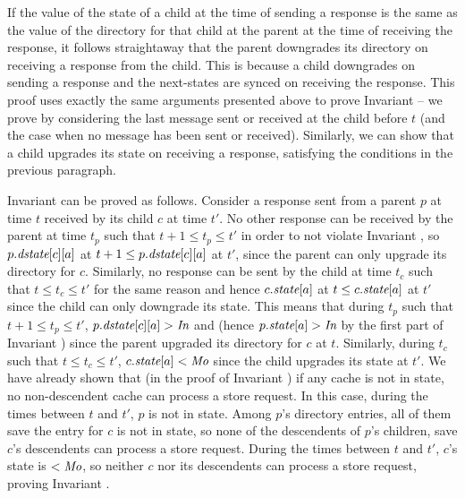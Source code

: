 If the value of the state of a child at the time of sending a response is the
same as the value of the directory for that child at the parent at the time of
receiving the response, it follows straightaway that the parent downgrades its
directory on receiving a response from the child. This is because a child
downgrades on sending a response and the next-states are synced on receiving
the response.  This proof uses exactly the same arguments presented above to
prove Invariant  -- we prove by considering the last
message sent or received at the child before $t$ (and the case when no message
has been sent or received). Similarly, we can show that a child upgrades its
state on receiving a response, satisfying the conditions in the previous paragraph.

Invariant  can be proved as follows. Consider a
response sent from a parent $p$ at time $t$ received by its child $c$ at time
$t'$. No other response can be received by the parent at time $t_p$ such that
$t+1 \le t_p \le t'$ in order to not violate Invariant , so
$p.\textit{dstate}[c][a]$ at $t+1 \le p.\textit{dstate}[c][a]$ at $t'$, since the parent can
only upgrade its directory for $c$. Similarly, no response can be sent by the
child at time $t_c$ such that $t \le t_c \le t'$ for the same reason and hence
$c.\textit{state}[a]$ at $t \le c.\textit{state}[a]$ at $t'$ since the child can only downgrade
its state.  This means that during $t_p$ such that $t+1 \le t_p \le t'$,
$p.\textit{dstate}[c][a] > \textit{In}$ and (hence $p.\textit{state}[a] > \textit{In}$ by the first part of
Invariant ) since the parent upgraded its directory
for $c$ at $t$.  Similarly, during $t_c$ such that $t \le t_c \le t'$,
$c.\textit{state}[a] < \textit{Mo}$ since the child upgrades its state at $t'$. We have already
shown that (in the proof of Invariant ) if any cache is
not in \In{} state, no non-descendent cache can process a store request. In
this case, during the times between $t$ and $t'$, $p$ is not in \In{} state.
Among $p$'s directory entries, all of them save the entry for $c$ is not in
\Mo{} state, so none of the descendents of $p$'s children, save $c$'s
descendents can process a store request. During the times between $t$ and $t'$,
$c$'s state is $< \textit{Mo}{}$, so neither $c$ nor its descendents can process a store
request, proving Invariant .

